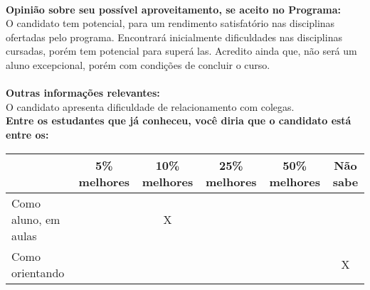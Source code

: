 \documentclass[11pt]{article}
\begin{document}
\\
\textbf{Opinião sobre seu possível aproveitamento, se aceito no Programa:}
\\O candidato tem potencial, para um rendimento satisfatório nas disciplinas ofertadas pelo programa. Encontrará inicialmente dificuldades nas disciplinas cursadas, porém tem potencial para superá las. Acredito ainda que, não será um aluno excepcional, porém com condições de concluir o curso.\\ 
\\
\textbf{Outras informações relevantes:} \\O candidato apresenta dificuldade de relacionamento com colegas.
\\[0.3cm]
\textbf{Entre os estudantes que já conheceu, você diria que o candidato está entre os:}
\\
\begin{tabular}{|l|c|c|c|c|c|}
\hline
 & 5\% melhores & 10\% melhores & 25\% melhores & 50\% melhores & Não sabe \\
\hline
Como aluno, em aulas &  & X &  &  & \\
\hline
Como orientando &  &  &  &  & X\\
\hline
\end{tabular}
\end{document}
